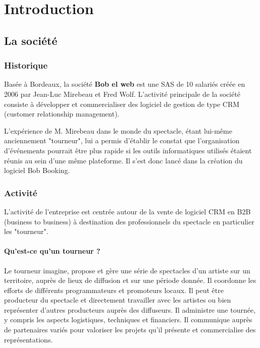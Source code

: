 

\chapter{Introduction}

\section{La société}

\subsection{Historique}
Basée à Bordeaux, la société \textbf{Bob el web} est une SAS de 10 salariés créée en 2006 par Jean-Luc Mirebeau et Fred Wolf.
L'activité principale de la société consiste à développer et commercialiser des logiciel de gestion de type CRM (customer relationship management). 

L'expérience de M. Mirebeau dans le monde du spectacle, étant lui-même anciennement "tourneur", lui a permis d’établir le constat que l'organisation d'événements pourrait être plus rapide si les outils informatiques utilisés étaient réunis au sein d'une même plateforme. Il s'est donc lancé dans la création du logiciel Bob Booking.


\subsection{Activité}

L'activité de l'entreprise est centrée autour de la vente de logiciel CRM en B2B (business to business) à destination des professionnels du spectacle en particulier les "tourneur".


\subsubsection{Qu'est-ce qu'un tourneur ?}
Le tourneur imagine, propose et gère une série de spectacles d'un artiste sur un territoire, auprès de lieux de diffusion et sur une période donnée. Il coordonne les efforts de différents programmateurs et promoteurs locaux. Il peut être producteur du spectacle et directement travailler avec les artistes ou bien représenter d'autres producteurs auprès des diffuseurs. Il administre une tournée, y compris les aspects logistiques, techniques et financiers. Il communique auprès de partenaires variés pour valoriser les projets qu'il présente et commercialise des représentations.

